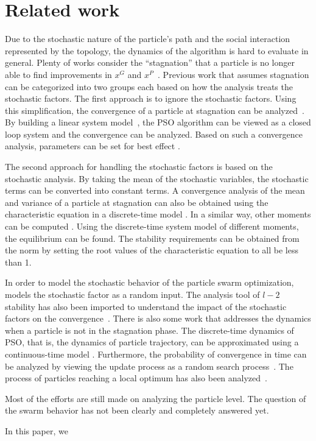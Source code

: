 \section{Related work}
\label{sec:rel_work}

Due to the stochastic nature of the particle's path and the social interaction represented by the topology, the dynamics of the algorithm is hard to evaluate in general.
Plenty of works consider the ``stagnation'' that a particle is no longer able to find improvements in $ x^{G} $ and $ x^{P} $~\cite{Clerc06stagnationanalysis}.
Previous work that assumes stagnation can be categorized into two groups each based on how the analysis treats the stochastic factors.
The first approach is to ignore the stochastic factors.
Using this simplification, the convergence of a particle at stagnation can be analyzed~\cite{985692}. 
By building a linear system model~\cite{4424687}, the PSO algorithm can be viewed as a closed loop system and the convergence can be analyzed.
Based on such a convergence analysis, parameters can be set for best effect \cite{Trelea2003317}.

The second approach for handling the stochastic factors is based on the stochastic analysis.
By taking the mean of the stochastic variables, the stochastic terms can be converted into
constant terms.
A convergence analysis of the mean and variance of a particle at stagnation can also be obtained using the characteristic equation in a discrete-time model 
\cite{Jiang20078}.
In a similar way, 
other moments can be computed
\cite{5175367,Poli:2007:EAS:1276958.1276977,Poli:2008:DSS:1384929.1384944}.
Using the discrete-time system model of different moments, the equilibrium can be found.
The stability requirements can be obtained from the norm by setting the root values of the characteristic equation to all be less than 1.

In order to model the stochastic behavior of the particle swarm optimization, \cite{1637686} models the stochastic factor as a random input.
The analysis tool of $ l-2 $ stability has also been imported to understand the impact of the stochastic factors on the convergence~\cite{5160341}.
There is also some work that addresses the dynamics when a particle is not in the stagnation phase.
The discrete-time dynamics of PSO, that is, the dynamics of particle trajectory, can be approximated
using a continuous-time model
\cite{5675669}.
Furthermore, the probability of convergence in time can be analyzed by viewing the update process as a random search process~\cite{vandenBergh:2010:CPP:2010420.2010421}.
The process of particles reaching a local optimum has also been analyzed~\cite{Schmitt:2013:PSO:2463372.2463563}.

Most of the efforts are still made on analyzing the particle level.
The question of the swarm behavior has not been clearly and completely answered yet.

In this paper, we 